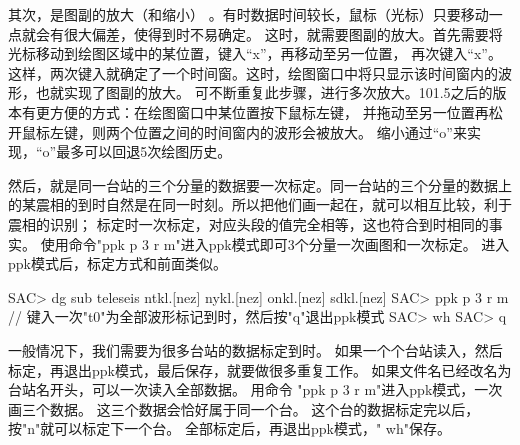 其次，是图副的放大（和缩小） 。有时数据时间较长，鼠标（光标）只要移动一点就会有很大偏差，使得到时不易确定。
这时，就需要图副的放大。首先需要将光标移动到绘图区域中的某位置，键入``x''，再移动至另一位置，
再次键入``x''。这样，两次键入就确定了一个时间窗。这时，绘图窗口中将只显示该时间窗内的波形，也就实现了图副的放大。
可不断重复此步骤，进行多次放大。101.5之后的版本有更方便的方式：在绘图窗口中某位置按下鼠标左键，
并拖动至另一位置再松开鼠标左键，则两个位置之间的时间窗内的波形会被放大。
缩小通过``o''来实现，``o''最多可以回退5次绘图历史。

然后，就是同一台站的三个分量的数据要一次标定。同一台站的三个分量的数据上的某震相的到时自然是在同一时刻。所以把他们画一起在，就可以相互比较，利于震相的识别；
标定时一次标定，对应头段的值完全相等，这也符合到时相同的事实。
使用命令"ppk p 3 r m"进入ppk模式即可3个分量一次画图和一次标定。
进入ppk模式后，标定方式和前面类似。

\begin{SACCode}
SAC> dg sub teleseis ntkl.[nez] nykl.[nez] onkl.[nez] sdkl.[nez]
SAC> ppk p 3 r m
// 键入一次"t0"为全部波形标记到时，然后按"q"退出ppk模式
SAC> wh
SAC> q
\end{SACCode}

一般情况下，我们需要为很多台站的数据标定到时。
如果一个个台站读入，然后标定，再退出ppk模式，最后保存，就要做很多重复工作。
如果文件名已经改名为台站名开头，可以一次读入全部数据。
用命令 "ppk p 3 r m"进入ppk模式，一次画三个数据。
这三个数据会恰好属于同一个台。
这个台的数据标定完以后，按"n"就可以标定下一个台。
全部标定后，再退出ppk模式，" wh"保存。

